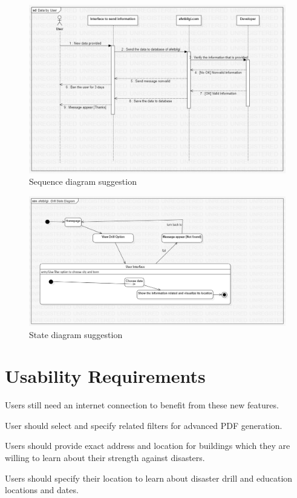 \documentclass[12pt]{report}
\begin{document}
\begin{figure}[H]
    \includegraphics[scale=0.5]{seq2}
    \centering
    \caption{Sequence diagram suggestion}
\end{figure}

\begin{figure}[H]
    \includegraphics[scale=0.5]{state2}
    \centering
    \caption{State diagram suggestion}
\end{figure}

\section{Usability Requirements}
Users still need an internet connection to benefit from these new features.

User should select and specify related filters for advanced PDF generation.

Users should provide exact address and location for buildings which they are willing to learn about their strength against disasters.

Users should specify their location to learn about disaster drill and education locations and dates.
\end{document}
